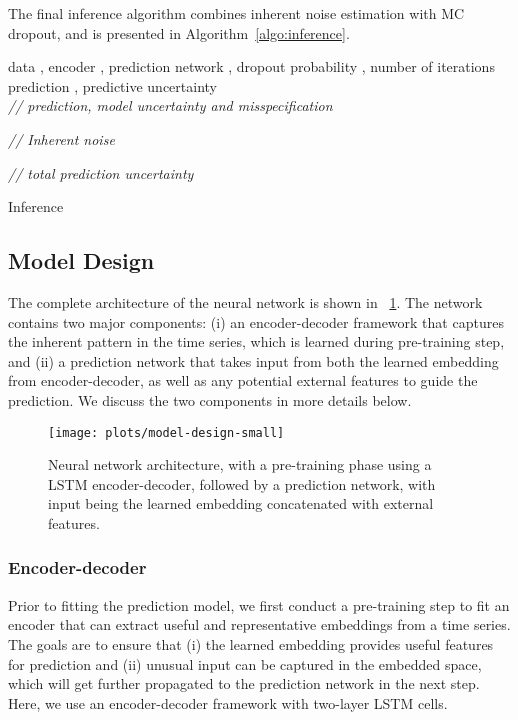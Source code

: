 \documentclass[conference,compsoc,final]{IEEEtran}
\begin{document}
The final inference algorithm combines inherent noise estimation with MC dropout, and is presented in Algorithm~\ref{algo:inference}.

\begin{algorithm}[H]

 \begin{algorithmic}[1]
 \renewcommand{\algorithmicrequire}{\textbf{Input:}}
 \renewcommand{\algorithmicensure}{\textbf{Output:}}
 \REQUIRE data , encoder , prediction network , dropout probability , number of iterations 
 \ENSURE prediction , predictive uncertainty 
 \\
 \vspace{3pt}
  \textit{// prediction, model uncertainty and misspecification}
   
    \vspace{3pt}
 \textit{// Inherent noise}
  \STATE 
  \ENDFOR
  \STATE 

\vspace{3pt}
 \textit{// total prediction uncertainty}
 \STATE 
 \RETURN 
 \end{algorithmic}
 \caption{Inference}
 \label{algo:inference}
 \end{algorithm}



\subsection{Model Design}
\label{sec:model-design}

The complete architecture of the neural network is shown in \figurename~\ref{fig:model}. The network contains two major components: (i) an encoder-decoder framework that captures the inherent pattern in the time series, which is learned during pre-training step, and (ii) a prediction network that takes input from both the learned embedding from encoder-decoder, as well as any potential external features to guide the prediction. We discuss the two components in more details below.

\begin{figure}[!t]
\centering
\texttt{[image: plots/model-design-small]}
\caption{Neural network architecture, with a pre-training phase using a LSTM encoder-decoder, followed by a prediction network, with input being the learned embedding concatenated with external features.}
\label{fig:model}
\end{figure}

\subsubsection{Encoder-decoder}
Prior to fitting the prediction model, we first conduct a pre-training step to fit an encoder that can extract useful and representative embeddings from a time series. The goals are to ensure that (i) the learned embedding provides useful features for prediction and (ii) unusual input can be captured in the embedded space, which will get further propagated to the prediction network in the next step. 
Here, we use an encoder-decoder framework with two-layer LSTM cells. 
\end{document}
